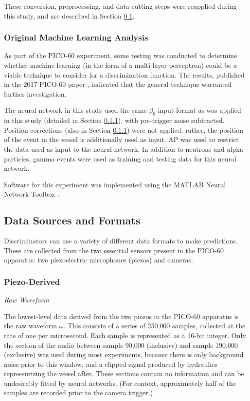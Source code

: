 \documentclass[10pt]{article}
\begin{document}
These conversion, preprocessing, and data cutting steps were reapplied during this study, and are described in Section \ref{data_formats}.

\subsubsection{Original Machine Learning Analysis}

As part of the PICO-60 experiment, some testing was conducted to determine whether machine learning (in the form of a multi-layer perceptron) could be a viable technique to consider for a discrimination function. The results, published in the 2017 PICO-60 paper \cite{pico}, indicated that the general technique warranted further investigation.

The neural network in this study used the same $\beta_{8}$ input format as was applied in this study (detailed in Section \ref{piezo_derived}), with pre-trigger noise subtracted. Position corrections (also in Section \ref{piezo_derived}) were not applied; rather, the position of the event in the vessel is additionally used as input. AP was used to restrict the data used as input to the neural network. In addition to neutrons and alpha particles, gamma events were used as training and testing data for this neural network.

Software for this experiment was implemented using the MATLAB Neural Network Toolbox \cite{matlab}.

\subsection{Data Sources and Formats} \label{data_formats}

Discriminators can use a variety of different data formats to make predictions. These are collected from the two essential sensors present in the PICO-60 apparatus: two piezoelectric microphones (piezos) and cameras.

\subsubsection{Piezo-Derived} \label{piezo_derived}

\textit{Raw Waveform}

The lowest-level data derived from the two piezos in the PICO-60 apparatus is the raw waveform $\omega$. This consists of a series of 250,000 samples, collected at the rate of one per microsecond. Each sample is represented as a 16-bit integer. Only the section of the audio between sample 90,000 (inclusive) and sample 190,000 (exclusive) was used during most experiments, because there is only background noise prior to this window, and a clipped signal produced by hydraulics repressurizing the vessel after. These sections contain no information and can be undesirably fitted by neural networks. (For context, approximately half of the samples are recorded prior to the camera trigger.)
\end{document}
